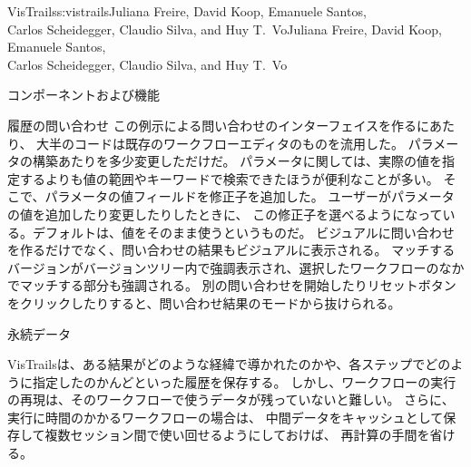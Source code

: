 \begin{aosachaptertoc}{VisTrails}{s:vistrails}{Juliana Freire, David Koop, Emanuele Santos, \\ Carlos Scheidegger, Claudio Silva, and Huy T.\ Vo}{Juliana Freire, David Koop, Emanuele Santos, \\ \hspace*{0.9cm} Carlos Scheidegger, Claudio Silva, and Huy T.\ Vo}
\begin{aosasect1}{コンポーネントおよび機能}
\begin{aosasect2}{履歴の問い合わせ}
この例示による問い合わせのインターフェイスを作るにあたり、
大半のコードは既存のワークフローエディタのものを流用した。
パラメータの構築あたりを多少変更しただけだ。
パラメータに関しては、実際の値を指定するよりも値の範囲やキーワードで検索できたほうが便利なことが多い。
そこで、パラメータの値フィールドを修正子を追加した。
ユーザーがパラメータの値を追加したり変更したりしたときに、
この修正子を選べるようになっている。デフォルトは、値をそのまま使うというものだ。
ビジュアルに問い合わせを作るだけでなく、問い合わせの結果もビジュアルに表示される。
マッチするバージョンがバージョンツリー内で強調表示され、選択したワークフローのなかでマッチする部分も強調される。
別の問い合わせを開始したりリセットボタンをクリックしたりすると、問い合わせ結果のモードから抜けられる。

\end{aosasect2}

\begin{aosasect2}{永続データ}

VisTrailsは、ある結果がどのような経緯で導かれたのかや、各ステップでどのように指定したのかんどといった履歴を保存する。
しかし、ワークフローの実行の再現は、そのワークフローで使うデータが残っていないと難しい。
さらに、実行に時間のかかるワークフローの場合は、
中間データをキャッシュとして保存して複数セッション間で使い回せるようにしておけば、
再計算の手間を省ける。


\end{aosasect2}
\end{aosasect1}
\end{aosachaptertoc}
